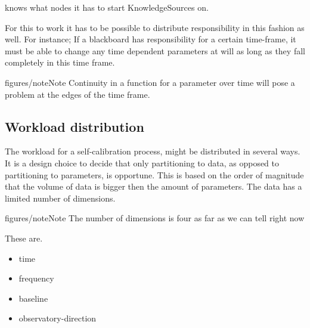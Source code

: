 \documentclass[]{lofar}
\begin{document}
 knows what
    nodes it has to start KnowledgeSources on.

   



    For this to work it has to be possible to distribute responsibility
    in this fashion as well. For instance; If a blackboard has
    responsibility for a certain time-frame, it must be able to change
    any time dependent parameters at will as long as they fall
    completely in this time frame. 
\begin{admonition}{figures/note}{Note}%
Continuity in a function for a
    parameter over time will pose a problem at the edges of the time
    frame.\end{admonition}



\subsection{Workload distribution}
\label{id2721283}\hypertarget{id2721283}{}%



    The workload for a self-calibration process, might be distributed
    in several ways. It is a design choice to decide that only
    partitioning to data, as opposed to partitioning to parameters, is
    opportune. This is based on the order of magnitude that the volume
    of data is bigger then the amount of parameters. The data has a
    limited number of dimensions. 
\begin{admonition}{figures/note}{Note}%
The number of dimensions is four as far as
    we can tell right now\end{admonition}

 These are.

    \begin{itemize}

	\item 

       time
      


	\item 

       frequency
      


	\item 

       baseline
      


	\item 

       observatory-direction
      

\end{itemize}
\end{document}
